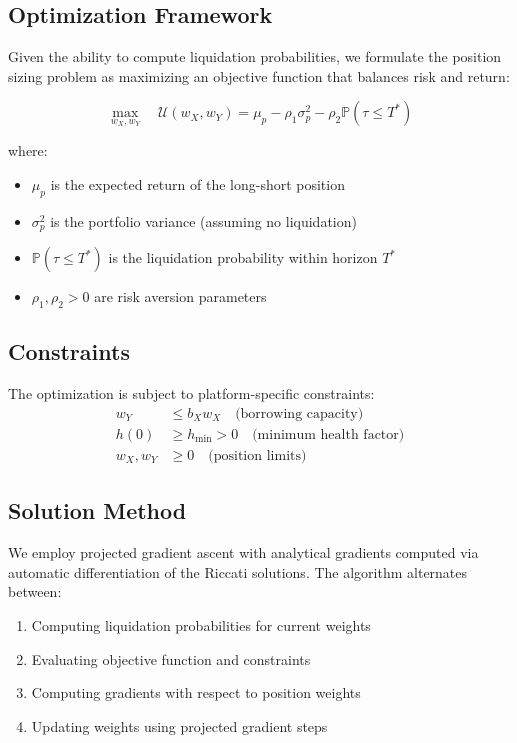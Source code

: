 \documentclass{article}
\renewcommand{\P}{\mathbb{P}}
\theoremstyle{definition}
\begin{document}
\subsection{Optimization Framework}

Given the ability to compute liquidation probabilities, we formulate the position sizing problem as maximizing an objective function that balances risk and return:

\begin{equation}
\max_{w_X, w_Y} \quad \mathcal{U}(w_X, w_Y) = \mu_p - \rho_1 \sigma_p^2 - \rho_2 \P(\tau \leq T^*) \label{eq:objective}
\end{equation}

where:
\begin{itemize}
    \item $\mu_p$ is the expected return of the long-short position
    \item $\sigma_p^2$ is the portfolio variance (assuming no liquidation)
    \item $\P(\tau \leq T^*)$ is the liquidation probability within horizon $T^*$
    \item $\rho_1, \rho_2 > 0$ are risk aversion parameters
\end{itemize}

\subsection{Constraints}

The optimization is subject to platform-specific constraints:
\begin{align}
w_Y &\leq b_X w_X \quad \text{(borrowing capacity)} \\
h(0) &\geq h_{\min} > 0 \quad \text{(minimum health factor)} \\
w_X, w_Y &\geq 0 \quad \text{(position limits)}
\end{align}

\subsection{Solution Method}

We employ projected gradient ascent with analytical gradients computed via automatic differentiation of the Riccati solutions. The algorithm alternates between:
\begin{enumerate}
    \item Computing liquidation probabilities for current weights
    \item Evaluating objective function and constraints
    \item Computing gradients with respect to position weights
    \item Updating weights using projected gradient steps
\end{enumerate}
\end{document}
